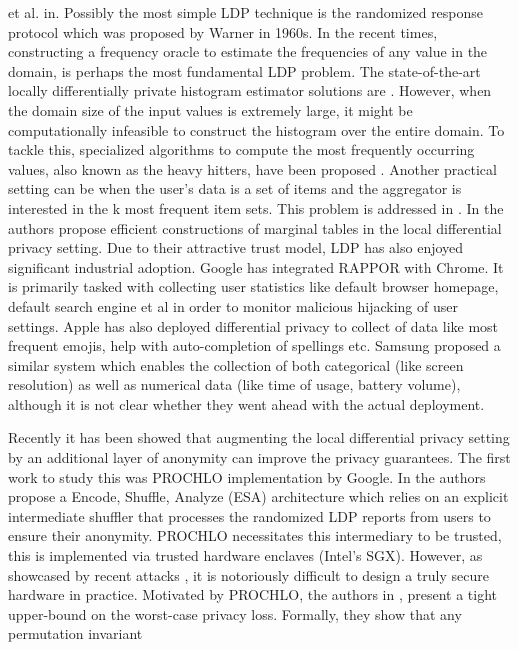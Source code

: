 et al. in\cite{Kasivi}. Possibly the most simple LDP technique is the randomized response \cite{RR} protocol which was proposed by Warner in 1960s.  In the recent times, constructing a frequency oracle to estimate the frequencies of any value in the domain, is perhaps the most fundamental LDP problem. The state-of-the-art locally differentially private histogram estimator solutions are \cite{LDP1, LDP2, Rappor1}.  However, when the domain size of the input values is extremely large, it might be computationally infeasible to construct the histogram over the entire domain. To tackle this, specialized algorithms to compute the most frequently occurring values, also known as the heavy hitters, have been proposed \cite{HH,Rappor2,HH2}. Another practical setting can be when the user's data is a set of items and the aggregator is interested in  the k most frequent item sets. This problem is addressed in \cite{15,itemset}. In \cite{Cormode, CALM} the authors propose efficient constructions of marginal tables in the local differential privacy setting. Due to their attractive trust model, LDP has also enjoyed significant industrial adoption.  Google has integrated RAPPOR \cite{Rappor1, Rappor2} with Chrome. It is primarily tasked with collecting user statistics like default browser homepage, default search engine et al in order to monitor malicious hijacking of user settings. Apple \cite{Apple} has also deployed differential privacy to collect of data like most frequent emojis, help with auto-completion of spellings etc.  Samsung \cite{Samsung} proposed a similar system 
which enables the collection of both categorical 
(like screen resolution) as well as numerical data (like
time of usage, battery volume), although it is not clear
whether they went ahead with the actual deployment. \par
Recently it has been showed that augmenting the local differential privacy setting by an additional layer of anonymity can improve the privacy
guarantees. The first work to study this was PROCHLO \cite{Prochlo} implementation by Google. In \cite{Prochlo} the authors propose a  Encode, Shuffle, Analyze (ESA) architecture
 which relies on an explicit intermediate shuffler that processes the randomized LDP reports
from users to ensure their anonymity. PROCHLO necessitates  this intermediary to be trusted, this is implemented via trusted hardware enclaves (Intel's SGX). However, as showcased by recent attacks \cite{Foreshadow}, it is notoriously difficult to design a  truly secure hardware in practice. Motivated by PROCHLO, the authors in \cite{amplification}, present a tight upper-bound on the worst-case privacy loss. Formally, they show that  any permutation invariant
